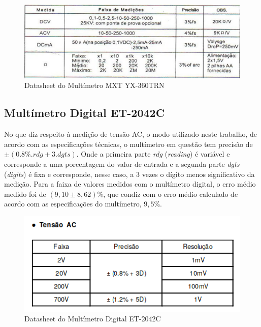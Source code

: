 \documentclass[14pt, oneside]{book}
\newcommand\tab[1][1cm]{\hspace*{#1}}
\theoremstyle{definition}
\begin{document}
                    \begin{figure}
                        \centering
                        \includegraphics[scale = 1]{datasheet2.png}
                        \caption{Datasheet do Multímetro MXT YX-360TRN}
                        \label{data2}
                    \end{figure}
                    
                    
                \subsection{Multímetro Digital ET-2042C}
                    \tab No que diz respeito à medição de tensão AC, o modo utilizado neste trabalho, de acordo
                    com as especificações técnicas, o multímetro em questão tem precisão de $\pm(0.8\%.rdg+3.dgts)$. Onde a primeira parte \textit{rdg} (\textit{reading}) é variável e corresponde a uma porcentagem
                    do valor de entrada e a segunda parte \textit{dgts} (\textit{digits}) é fixa e corresponde, nesse caso, a $3$
                    vezes o dígito menos significativo da medição.
                    Para a faixa de valores medidos com o multímetro digital, o erro médio medido foi de
                    $(9,10\pm 8,62)\%$, que condiz com o erro médio calculado de acordo com as especificações do multímetro, $9,5\%$.
                    
                    \begin{figure}[H]
                        \centering
                        \includegraphics{datasheet3.png}
                        \caption{Datasheet do Multímetro Digital ET-2042C}
                        \label{data3}
                    \end{figure}
\end{document}

